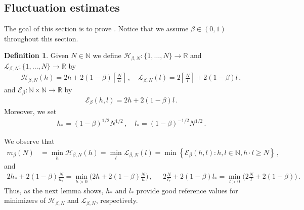 \documentclass[reqno]{amsart}
\theoremstyle{plain}
\theoremstyle{definition}
\newtheorem{definition}[theorem]{Definition}
\numberwithin{equation}{section}
\begin{document}


\subsection{Fluctuation estimates}\label{sec:fluctuation} 

 
The goal of this section is to prove . 
Notice that we assume  $\beta \in (0,1)$ throughout this section. 

\begin{definition}\label{def:energies1d2d}
Given $N \in \mathbb{N}$ we define $\mathcal{H}_{\beta,N} \colon \{1,\ldots,N\} \to \mathbb{R}$   and $\mathcal{L}_{\beta,N} \colon \{1,\ldots,N\} \to \mathbb{R}$ by
\begin{align}\label{def:HL}
\mathcal{H}_{\beta,N}(h) = 2h + 2(1-\beta) \left\lceil \frac{N}{h} \right\rceil\,, \quad  \mathcal{L}_{\beta,N}(l) = 2\left\lceil \frac{N}{l} \right\rceil + 2(1-\beta) l\,,
\end{align}
and $\mathcal{E}_\beta \colon \mathbb{N} \times \mathbb{N} \to \mathbb{R}$ by 
\begin{align*}
\mathcal{E}_\beta(h,l) = 2h + 2(1-\beta) l\,.
\end{align*}
Moreover, we set
\begin{align}\label{def:hstar}
h_* =(1-\beta)^{1/2}  N^{1/2} \,, \quad l_* = (1-\beta)^{-1/2}  N^{1/2} \,.
\end{align}
\end{definition}
We observe that 
\begin{align*}
m_\beta(N) &= \min_h \mathcal{H}_{\beta,N}(h) =\min_l \mathcal{L}_{\beta,N}(l) = \min \left\{\mathcal{E}_\beta(h,l) \colon h,l \in \mathbb{N}, h\cdot l \geq N \right\}\,,
\end{align*}
and 
\begin{align*}
2h_* + 2(1-\beta) \frac{N}{h_*} = \min_{h>0} \Big(2h +  2(1-\beta) \frac{N}{h}\Big)\,, \ \ \quad    2\frac{N}{l_*} +  2(1-\beta)  l_*= \min_{l>0} \Big(2\frac{N}{l} + 2(1-\beta)  \Big)\,.
\end{align*}
Thus, as the next lemma shows, $h_*$ and $l_*$ provide good reference values for minimizers of $\mathcal{H}_{\beta,N}$  and $\mathcal{L}_{\beta,N}$, respectively.
\end{document}

